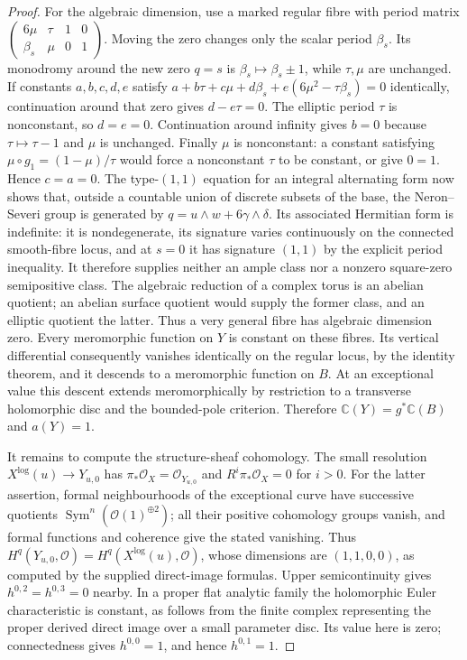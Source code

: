 \begin{proof}
For the algebraic dimension, use a marked regular fibre with
period matrix $\left(\begin{smallmatrix}6\mu&\tau&1&0\\
\beta_s&\mu&0&1\end{smallmatrix}\right)$.
Moving the zero changes only the scalar period $\beta_s$. Its
monodromy around the new zero $q=s$ is
$\beta_s\mapsto\beta_s\pm1$, while $\tau,\mu$ are unchanged.
If constants $a,b,c,d,e$ satisfy
$a+b\tau+c\mu+d\beta_s+e(6\mu^2-\tau\beta_s)=0$
identically, continuation around that zero gives $d-e\tau=0$.
The elliptic period $\tau$ is nonconstant, so $d=e=0$.
Continuation around infinity gives $b=0$ because
$\tau\mapsto\tau-1$ and $\mu$ is unchanged. Finally $\mu$ is
nonconstant: a constant satisfying
$\mu\circ g_1=(1-\mu)/\tau$ would force a nonconstant $\tau$ to
be constant, or give $0=1$. Hence $c=a=0$.
The type-$(1,1)$ equation for an integral alternating form now
shows that, outside a countable union of discrete subsets of the
base, the Neron--Severi group is generated by
$q=u\wedge w+6\gamma\wedge\delta$. Its associated Hermitian form
is indefinite: it is nondegenerate, its signature varies
continuously on the connected smooth-fibre locus, and at $s=0$
it has signature $(1,1)$ by the explicit period inequality.
It therefore supplies neither an ample class nor a nonzero
square-zero semipositive class. The algebraic reduction of a
complex torus is an abelian quotient; an abelian surface quotient
would supply the former class, and an elliptic quotient the latter.
Thus a very general fibre has algebraic dimension zero.
Every meromorphic function on $Y$ is constant on these fibres.
Its vertical differential consequently vanishes identically on
the regular locus, by the identity theorem, and it descends to a
meromorphic function on $B$. At an exceptional value this descent
extends meromorphically by restriction to a transverse holomorphic
disc and the bounded-pole criterion. Therefore
$\mathbb C(Y)=g^*\mathbb C(B)$ and $a(Y)=1$.

It remains to compute the structure-sheaf cohomology. The small
resolution $X^{\log}(u)\to Y_{u,0}$ has
$\pi_*\mathcal O_X=\mathcal O_{Y_{u,0}}$ and
$R^i\pi_*\mathcal O_X=0$ for $i>0$. For the latter assertion,
formal neighbourhoods of the exceptional curve have successive
quotients $\operatorname{Sym}^n(\mathcal O(1)^{\oplus2})$;
all their positive cohomology groups vanish, and formal functions
and coherence give the stated vanishing. Thus
$H^q(Y_{u,0},\mathcal O)=H^q(X^{\log}(u),\mathcal O)$, whose dimensions
are $(1,1,0,0)$, as computed by the supplied direct-image formulas.
Upper semicontinuity gives $h^{0,2}=h^{0,3}=0$ nearby. In a proper
flat analytic family the holomorphic Euler characteristic is
constant, as follows from the finite complex representing the
proper derived direct image over a small parameter disc. Its
value here is zero; connectedness gives $h^{0,0}=1$, and hence
$h^{0,1}=1$.
\end{proof}

